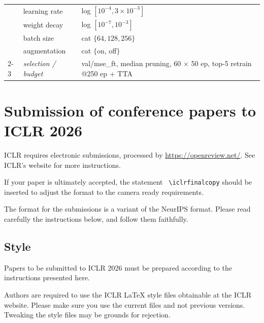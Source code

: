 \documentclass{article} %
\begin{document}
\begin{table}[h]
\begin{center}
\begin{tabular}{lll}
 & learning rate        & log $[10^{-4}, 3\!\times\!10^{-3}]$ \\
 & weight decay         & log $[10^{-7}, 10^{-3}]$ \\
 & batch size           & cat $\{64, 128, 256\}$ \\
 & augmentation         & cat $\{$on, off$\}$ \\
\cmidrule(l){2-3}
 & \emph{selection / budget} & val/mse\_ft, median pruning, 60 $\times$ 50 ep, top-5 retrain @250 ep + TTA \\
\bottomrule
\end{tabular}
\end{center}
\end{table}

\iffalse
\section{Submission of conference papers to ICLR 2026}

ICLR requires electronic submissions, processed by
\url{https://openreview.net/}. See ICLR's website for more instructions.

If your paper is ultimately accepted, the statement {\tt
  {\textbackslash}iclrfinalcopy} should be inserted to adjust the
format to the camera ready requirements.

The format for the submissions is a variant of the NeurIPS format.
Please read carefully the instructions below, and follow them
faithfully.

\subsection{Style}

Papers to be submitted to ICLR 2026 must be prepared according to the
instructions presented here.


Authors are required to use the ICLR \LaTeX{} style files obtainable at the
ICLR website. Please make sure you use the current files and
not previous versions. Tweaking the style files may be grounds for rejection.
\end{document}
